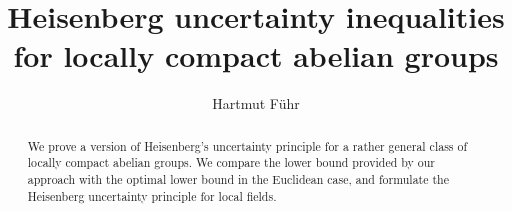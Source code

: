 \documentclass[12pt, reqno]{amsart}
\begin{document}
\title[Heisenberg uncertainty for lca groups]{Heisenberg uncertainty inequalities for locally compact abelian groups}



\author{Hartmut F\"uhr}

\address{Lehrstuhl f\"ur Geometrie und Analysis, RWTH Aachen University, D-52056 Aachen,
Germany}



%
% 
%
%










\begin{abstract}
We prove a version of Heisenberg's uncertainty principle for a rather general class of locally compact abelian groups. We compare the lower bound provided by our approach with the optimal lower bound in the Euclidean case, and formulate the Heisenberg uncertainty principle for local fields. 
\end{abstract}
\end{document}

